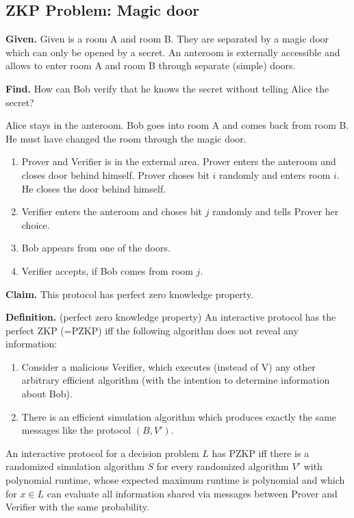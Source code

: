 \documentclass[a4paper]{article}
\newcommand{\given}[1]{\textbf{Given.} #1\par}
\newcommand{\find}[1]{\textbf{Find.} #1\par}
\newenvironment{spec}[0]{\begin{framed}}{\end{framed}}
\begin{document}
\subsection{ZKP Problem: Magic door}
%
\begin{spec}
  \given{Given is a room A and room B. They are separated by a magic door
    which can only be opened by a secret. An anteroom is externally accessible and
    allows to enter room A and room B through separate (simple) doors.}
  \find{How can Bob verify that he knows the secret without telling Alice the secret?}
\end{spec}

Alice stays in the anteroom. Bob goes into room A and comes back from room B.
He must have changed the room through the magic door.

\begin{enumerate}
  \item Prover and Verifier is in the external area.
        Prover enters the anteroom and closes door behind himself.
        Prover choses bit $i$ randomly and enters room $i$. He closes
        the door behind himself.
  \item Verifier enters the anteroom and choses bit $j$ randomly
        and tells Prover her choice.
  \item Bob appears from one of the doors.
  \item Verifier accepts, if Bob comes from room $j$.
\end{enumerate}

\textbf{Claim.}
  This protocol has perfect zero knowledge property.

\textbf{Definition.} (perfect zero knowledge property)
  An interactive protocol has the perfect ZKP (=PZKP) iff
  the following algorithm does not reveal any information:
  \begin{enumerate}
    \item Consider a malicious Verifier, which executes
          (instead of V) any other arbitrary efficient algorithm
          (with the intention to determine information about Bob).
    \item There is an efficient simulation algorithm which produces
          exactly the same messages like the protocol $(B, V')$.
  \end{enumerate}

An interactive protocol for a decision problem $L$ has PZKP
iff there is a randomized simulation algorithm $S$ for
every randomized algorithm $V'$ with polynomial runtime,
whose expected maximum runtime is polynomial and which for
$x \in L$ can evaluate all information shared via messages
between Prover and Verifier with the same probability.
\end{document}

